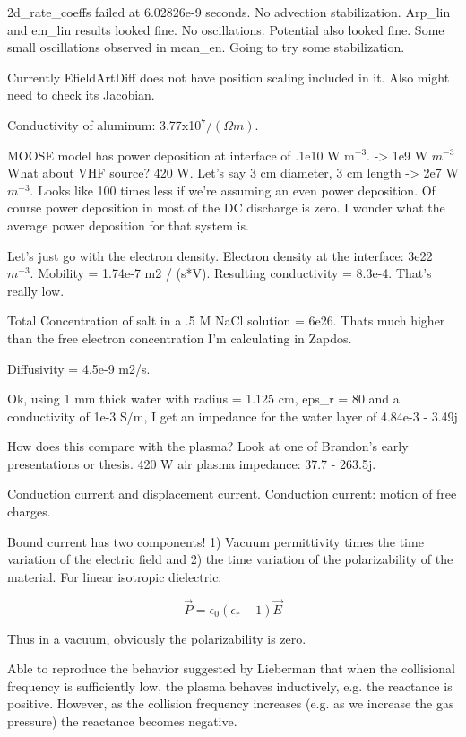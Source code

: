 {2d\_rate\_coeffs failed at 6.02826e-9 seconds. No advection stabilization. Arp\_lin and em\_lin results looked fine. No oscillations. Potential also looked fine. Some small oscillations observed in mean\_en. Going to try some stabilization.

Currently EfieldArtDiff does not have position scaling included in it. Also might need to check its Jacobian.

Conductivity of aluminum: 3.77x10$^7/(\Omega m)$.

MOOSE model has power deposition at interface of .1e10 W m$^{-3}$. -> 1e9 W $m^{-3}$
What about VHF source? 420 W. Let's say 3 cm diameter, 3 cm length -> 2e7 W $m^{-3}$. Looks like 100 times less if we're assuming an even power deposition. Of course power deposition in most of the DC discharge is zero. I wonder what the average power deposition for that system is.

Let's just go with the electron density. Electron density at the interface: 3e22 $m^{-3}$. Mobility = 1.74e-7 m2 / (s*V). Resulting conductivity = 8.3e-4. That's really low.

Total Concentration of salt in a .5 M NaCl solution = 6e26. Thats much higher than the free electron concentration I'm calculating in Zapdos.

Diffusivity = 4.5e-9 m2/s.

Ok, using 1 mm thick water with radius = 1.125 cm, eps\_r = 80 and a conductivity of 1e-3 S/m, I get an impedance for the water layer of 4.84e-3 - 3.49j

How does this compare with the plasma? Look at one of Brandon's early presentations or thesis. 420 W air plasma impedance: 37.7 - 263.5j.

Conduction current and displacement current. Conduction current: motion of free charges.

Bound current has two components! 1) Vacuum permittivity times the time variation of the electric field and 2) the time variation of the polarizability of the material. For linear isotropic dielectric:

\begin{equation}
  \vec{P} = \epsilon_0\left(\epsilon_r-1\right)\vec{E}
\end{equation}

Thus in a vacuum, obviously the polarizability is zero.

Able to reproduce the behavior suggested by Lieberman that when the collisional frequency is sufficiently low, the plasma behaves inductively, e.g. the reactance is positive. However, as the collision frequency increases (e.g. as we increase the gas pressure) the reactance becomes negative.

}
